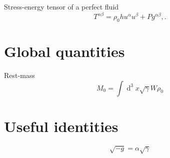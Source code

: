 \documentclass[]{scrartcl}
\renewcommand{\d}[1]{\ensuremath{\operatorname{d}\!{#1}}}
\begin{document}
Stress-energy tensor of a perfect fluid
\begin{equation}
  \label{eq:8}
  T^{\alpha\beta} = \rho_0 h u^\alpha u^\beta + P g^{\alpha\beta},.
\end{equation}

\section{Global quantities}
\label{sec:global-quantities}

Rest-mass
\begin{equation}
  \label{eq:1}
  M_0 = \int \d{}^{3} x \sqrt{\gamma} W \rho_0
\end{equation}
\section{Useful identities}
\label{sec:useful-identities}

\begin{equation}
  \label{eq:3}
  \sqrt{-g} = \alpha \sqrt{\gamma}
\end{equation}
\end{document}
